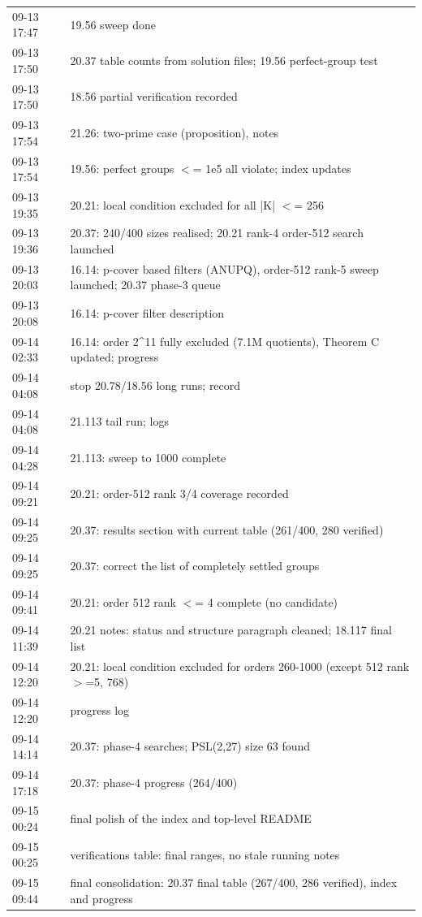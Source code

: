 \begin{longtable}{lp{12.5cm}}
09-13 17:47 & 19.56 sweep done \\
09-13 17:50 & 20.37 table counts from solution files; 19.56 perfect-group test \\
09-13 17:50 & 18.56 partial verification recorded \\
09-13 17:54 & 21.26: two-prime case (proposition), notes \\
09-13 17:54 & 19.56: perfect groups $<$= 1e5 all violate; index updates \\
09-13 19:35 & 20.21: local condition excluded for all |K| $<$= 256 \\
09-13 19:36 & 20.37: 240/400 sizes realised; 20.21 rank-4 order-512 search launched \\
09-13 20:03 & 16.14: p-cover based filters (ANUPQ), order-512 rank-5 sweep launched; 20.37 phase-3 queue \\
09-13 20:08 & 16.14: p-cover filter description \\
09-14 02:33 & 16.14: order 2\^{}11 fully excluded (7.1M quotients), Theorem C updated; progress \\
09-14 04:08 & stop 20.78/18.56 long runs; record \\
09-14 04:08 & 21.113 tail run; logs \\
09-14 04:28 & 21.113: sweep to 1000 complete \\
09-14 09:21 & 20.21: order-512 rank 3/4 coverage recorded \\
09-14 09:25 & 20.37: results section with current table (261/400, 280 verified) \\
09-14 09:25 & 20.37: correct the list of completely settled groups \\
09-14 09:41 & 20.21: order 512 rank $<$= 4 complete (no candidate) \\
09-14 11:39 & 20.21 notes: status and structure paragraph cleaned; 18.117 final list \\
09-14 12:20 & 20.21: local condition excluded for orders 260-1000 (except 512 rank$>$=5, 768) \\
09-14 12:20 & progress log \\
09-14 14:14 & 20.37: phase-4 searches; PSL(2,27) size 63 found \\
09-14 17:18 & 20.37: phase-4 progress (264/400) \\
09-15 00:24 & final polish of the index and top-level README \\
09-15 00:25 & verifications table: final ranges, no stale running notes \\
09-15 09:44 & final consolidation: 20.37 final table (267/400, 286 verified), index and progress \\
\bottomrule
\end{longtable}
\normalsize
